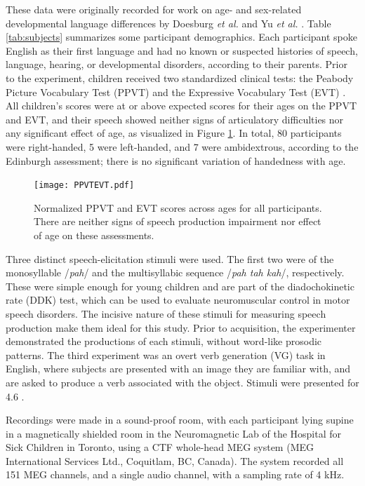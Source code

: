 \documentclass[a4paper]{article}
\begin{document}
These data were originally recorded for work on age- and sex-related developmental language differences by Doesburg \emph{et al.} and Yu \emph{et al.} \cite{Doesburg2016, Yu2014}. Table \ref{tab:subjects} summarizes some participant demographics. Each participant spoke English as their first language and had no known or suspected histories of speech, language, hearing, or developmental disorders, according to their parents. Prior to the experiment, children received two standardized clinical tests: the Peabody Picture Vocabulary Test (PPVT) \cite{Dunn97} and the Expressive Vocabulary Test (EVT) \cite{EVT}. All children's scores were at or above expected scores for their ages on the PPVT and EVT, and their speech showed neither signs of articulatory difficulties nor any significant effect of age, as visualized in Figure \ref{fig:ppvtevt}. In total, 80 participants were right-handed, 5 were left-handed, and 7 were ambidextrous, according to the Edinburgh assessment; there is no significant variation of handedness with age.

\begin{figure}
\texttt{[image: PPVTEVT.pdf]}
\caption{Normalized PPVT and EVT scores across ages for all participants. There are neither signs of speech production impairment nor effect of age on these assessments.}
\label{fig:ppvtevt}
\end{figure}

Three distinct speech-elicitation stimuli were used. The first two were of the monosyllable /{\em pah}/ and the multisyllabic sequence /{\em pah tah kah}/, respectively. These were simple enough for young children and are part of the diadochokinetic rate (DDK) test, which can be used to evaluate neuromuscular control in motor speech disorders. The incisive nature of these stimuli for measuring speech production make them ideal for this study. Prior to acquisition, the experimenter demonstrated the productions of each stimuli, without word-like prosodic patterns. The third experiment was an overt verb generation (VG) task in English, where subjects are presented with an image they are familiar with, and are asked to produce a verb associated with the object. Stimuli were presented for 4.6 \cite{Doesburg2016}.

Recordings were made in a sound-proof room, with each participant lying supine in a magnetically shielded room in the Neuromagnetic Lab of the Hospital for Sick Children in Toronto, using a CTF whole-head MEG system (MEG International Services Ltd., Coquitlam, BC, Canada). The system recorded all 151 MEG channels, and a single audio channel, with a sampling rate of 4 kHz.
\end{document}
